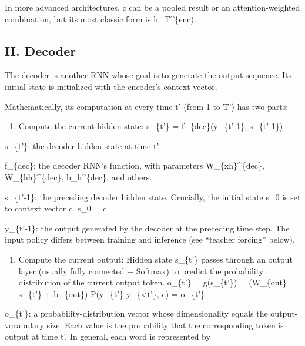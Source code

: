 In more advanced architectures, c can be a pooled result or an attention-weighted combination, but its most classic form is h\_T\^{}\{enc).

\hypertarget{ii.-decoder}{%
\subsection{II. Decoder}\label{ii.-decoder}}

The decoder is another RNN whose goal is to generate the output sequence. Its initial state is initialized with the encoder's context vector.

Mathematically, its computation at every time t' (from 1 to T') has two parts:

\begin{enumerate}
\def\labelenumi{\alph{enumi})}
\tightlist
\item
{}
  Compute the current hidden state:
  s\_\{t'\} = f\_\{dec\}(y\_\{t'-1\}, s\_\{t'-1\})
\end{enumerate}

s\_\{t'\}: the decoder hidden state at time t'.

f\_\{dec\}: the decoder RNN's function, with parameters W\_\{xh\}\^{}\{dec\}, W\_\{hh\}\^{}\{dec\}, b\_h\^{}\{dec\}, and others.

s\_\{t'-1\}: the preceding decoder hidden state. Crucially, the initial state s\_0 is set to context vector c.
s\_0 = c

y\_\{t'-1\}: the output generated by the decoder at the preceding time step. The input policy differs between training and inference (see ``teacher forcing'' below).

\begin{enumerate}
\def\labelenumi{\alph{enumi})}
\setcounter{enumi}{1}
\tightlist
\item
{}
  Compute the current output:
  Hidden state s\_\{t'\} passes through an output layer (usually fully connected + Softmax) to predict the probability distribution of the current output token.
  o\_\{t'\} = g(s\_\{t'\}) = (W\_\{out\} s\_\{t'\} + b\_\{out\})
  P(y\_\{t'\} \textbar{} y\_\{\textless t'\}, c) = o\_\{t'\}
\end{enumerate}

o\_\{t'\}: a probability-distribution vector whose dimensionality equals the output-vocabulary size. Each value is the probability that the corresponding token is output at time t'. In general, each word is represented by

